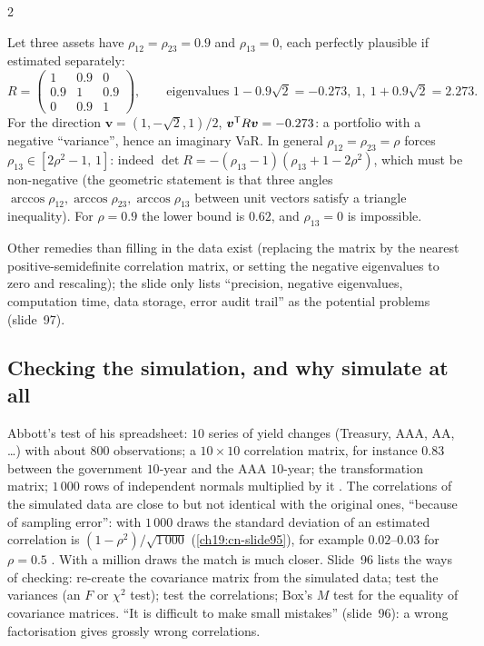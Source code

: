 \begin{paracol}{2}
\begin{example}\label{ch19:ex-psd}
Let three assets have $\rho_{12}=\rho_{23}=0.9$ and $\rho_{13}=0$, each perfectly plausible if estimated separately:
\[
  R=\begin{pmatrix}1&0.9&0\\0.9&1&0.9\\0&0.9&1\end{pmatrix},\qquad\text{eigenvalues }1-0.9\sqrt2=-0.273,\ 1,\ 1+0.9\sqrt2=2.273 .
\]
For the direction $\bm v=(1,-\sqrt2,1)/2$, $\bm v^{\mathsf T} R\bm v=-0.273$: a portfolio with a negative ``variance'', hence an imaginary VaR. In general $\rho_{12}=\rho_{23}=\rho$ forces $\rho_{13}\in[2\rho^2-1,\,1]$: indeed $\det R=-(\rho_{13}-1)(\rho_{13}+1-2\rho^2)$, which must be non-negative (the geometric statement is that three angles $\arccos\rho_{12},\arccos\rho_{23},\arccos\rho_{13}$ between unit vectors satisfy a triangle inequality). For $\rho=0.9$ the lower bound is $0.62$, and $\rho_{13}=0$ is impossible.
\end{example}
Other remedies than filling in the data exist (replacing the matrix by the nearest positive-semidefinite correlation matrix, or setting the negative eigenvalues to zero and rescaling); the slide only lists ``precision, negative eigenvalues, computation time, data storage, error audit trail'' as the potential problems (slide~97).

\subsection{Checking the simulation, and why simulate at all}
Abbott's test of his spreadsheet: $10$ series of yield changes (Treasury, AAA, AA, \dots) with about $800$ observations; a $10\times10$ correlation matrix, for instance $0.83$ between the government $10$-year and the AAA $10$-year; the transformation matrix; $1\,000$ rows of independent normals multiplied by it . The correlations of the simulated data are close to but not identical with the original ones, ``because of sampling error'': with $1\,000$ draws the standard deviation of an estimated correlation is $(1-\rho^2)/\sqrt{1\,000}$ (\cref{ch19:cn-slide95}), for example $0.02$--$0.03$ for $\rho=0.5$ . With a million draws the match is much closer. Slide~96 lists the ways of checking: re-create the covariance matrix from the simulated data; test the variances (an $F$ or $\chi^2$ test); test the correlations; Box's $M$ test for the equality of covariance matrices. ``It is difficult to make small mistakes'' (slide~96): a wrong factorisation gives grossly wrong correlations.


\end{paracol}
